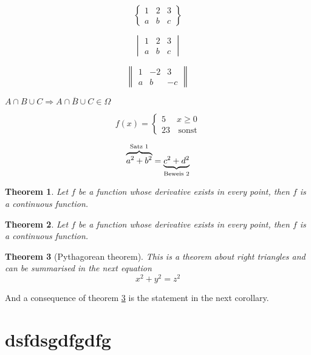 \documentclass[12pt,ngerman]{scrreprt}
\newcommand{\foobar}{\refstepcounter{equation}\theequation}
\newtheorem{theorem}{Theorem}[chapter]
\begin{document}
\begin{equation}
\begin{Bmatrix}
1 & 2 & 3\\
a & b & c
\end{Bmatrix}
\end{equation}

\begin{equation}
\begin{vmatrix}
1 & 2 & 3\\
a & b & c
\end{vmatrix}
\end{equation}

\begin{equation}
\begin{Vmatrix}
1 & -2 & 3\\
a & b & -c
\end{Vmatrix}
\end{equation}

\( A \cap B  \cup C \Rightarrow \overline{A \cap B  \cup C} \in \Omega \)


\[f(x) = \begin{cases}
5 & x \geq 0 \\
23 & \, \text{sonst}
\end{cases}\]



\[ \overbrace{a^2 + b^2}^\text{Satz \foobar} = \underbrace{c^2 + d^2}_{\text{Beweis \foobar}} \]


\begin{theorem}
Let \(f\) be a function whose derivative exists in every point, then \(f\) 
is a continuous function.
\end{theorem}


\begin{theorem}
Let \(f\) be a function whose derivative exists in every point, then \(f\) is 
a continuous function.
\end{theorem}

\begin{theorem}[Pythagorean theorem]
\label{pythagorean}
This is a theorem about right triangles and can be summarised in the next 
equation 
\[ x^2 + y^2 = z^2 \]
\end{theorem}

And a consequence of theorem \ref{pythagorean} is the statement in the next 
corollary.

\section{dsfdsgdfgdfg}
\end{document}
